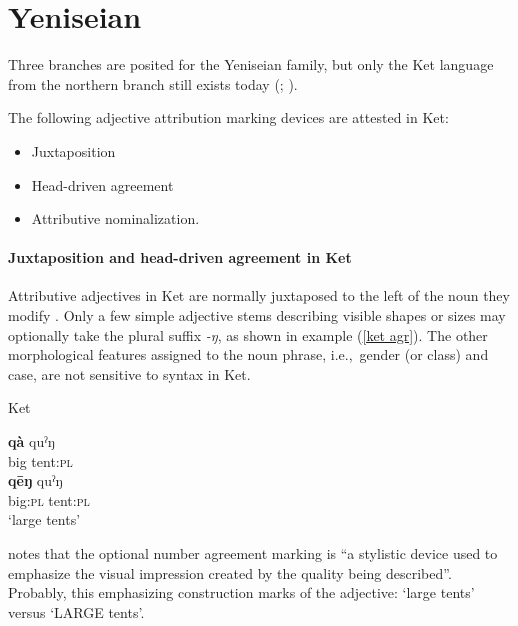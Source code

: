 \section{Yeniseian}\label{yeniseian synchr}
Three branches are posited for the Yeniseian family, but only the Ket language from the northern branch still exists today (\citealt{werner1997a}; \citealt[223]{salminen2007}).

The following adjective attribution marking devices are attested in Ket:
\begin{itemize}
\item Juxtaposition
\item Head\hyp{}driven agreement
\item Attributive nominalization.
\end{itemize}

\paragraph*{Juxtaposition and head\hyp{}driven agreement in Ket}
Attributive adjectives in Ket are normally juxtaposed to the left of the noun they modify \cite[38]{vajda2004}. Only a few simple adjective stems describing visible shapes or sizes may optionally take the plural suffix \textit{-ŋ}, as shown in example (\ref{ket agr}). The other morphological features assigned to the noun phrase, i.e.,~gender (or class) and case, are not sensitive to syntax in Ket.
\begin{exe}
\ex 
\label{ket agr}
\rm{Ket \citep[38]{vajda2004}} 
\begin{xlist}
\ex	
\gll	\textbf{qà} quˀŋ\\
	big tent:\textsc{pl}\\
\ex	
\gll	\textbf{qēŋ} quˀŋ\\
	big:\textsc{pl} tent:\textsc{pl}\\
\glt	‘large tents’
\end{xlist}
\end{exe}
\citet[38]{vajda2004} notes that the optional number agreement marking is “a stylistic device used to emphasize the visual impression created by the quality being described”. Probably, this emphasizing construction marks  of the adjective: ‘large tents’ versus ‘LARGE tents’.

